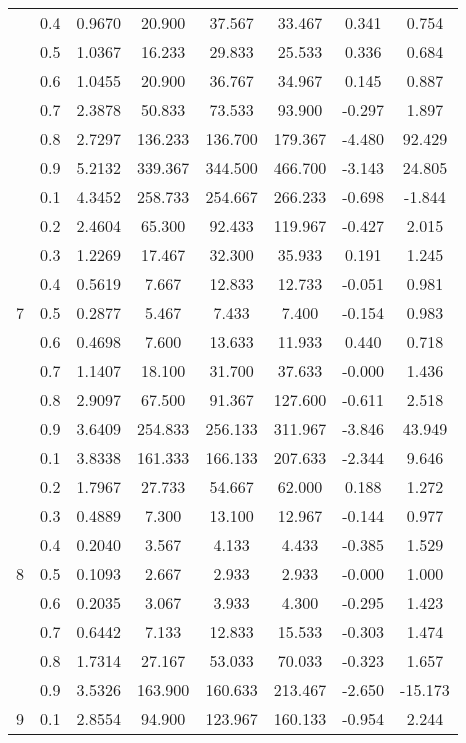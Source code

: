 \documentclass[11pt,a4paper]{report}
\begin{document}
\begin{longtable}{ | c | c || c | c | c | c | c | c | }
 & 0.4 & 0.9670 & 20.900 & 37.567 & 33.467 & 0.341 & 0.754 \\
 & 0.5 & 1.0367 & 16.233 & 29.833 & 25.533 & 0.336 & 0.684 \\
 & 0.6 & 1.0455 & 20.900 & 36.767 & 34.967 & 0.145 & 0.887 \\
 & 0.7 & 2.3878 & 50.833 & 73.533 & 93.900 & -0.297 & 1.897 \\
 & 0.8 & 2.7297 & 136.233 & 136.700 & 179.367 & -4.480 & 92.429 \\
 & 0.9 & 5.2132 & 339.367 & 344.500 & 466.700 & -3.143 & 24.805 \\
 \hline
\multirow{9}{*}{7} & 0.1 & 4.3452 & 258.733 & 254.667 & 266.233 & -0.698 & -1.844 \\
 & 0.2 & 2.4604 & 65.300 & 92.433 & 119.967 & -0.427 & 2.015 \\
 & 0.3 & 1.2269 & 17.467 & 32.300 & 35.933 & 0.191 & 1.245 \\
 & 0.4 & 0.5619 & 7.667 & 12.833 & 12.733 & -0.051 & 0.981 \\
 & 0.5 & 0.2877 & 5.467 & 7.433 & 7.400 & -0.154 & 0.983 \\
 & 0.6 & 0.4698 & 7.600 & 13.633 & 11.933 & 0.440 & 0.718 \\
 & 0.7 & 1.1407 & 18.100 & 31.700 & 37.633 & -0.000 & 1.436 \\
 & 0.8 & 2.9097 & 67.500 & 91.367 & 127.600 & -0.611 & 2.518 \\
 & 0.9 & 3.6409 & 254.833 & 256.133 & 311.967 & -3.846 & 43.949 \\
 \hline
\multirow{9}{*}{8} & 0.1 & 3.8338 & 161.333 & 166.133 & 207.633 & -2.344 & 9.646 \\
 & 0.2 & 1.7967 & 27.733 & 54.667 & 62.000 & 0.188 & 1.272 \\
 & 0.3 & 0.4889 & 7.300 & 13.100 & 12.967 & -0.144 & 0.977 \\
 & 0.4 & 0.2040 & 3.567 & 4.133 & 4.433 & -0.385 & 1.529 \\
 & 0.5 & 0.1093 & 2.667 & 2.933 & 2.933 & -0.000 & 1.000 \\
 & 0.6 & 0.2035 & 3.067 & 3.933 & 4.300 & -0.295 & 1.423 \\
 & 0.7 & 0.6442 & 7.133 & 12.833 & 15.533 & -0.303 & 1.474 \\
 & 0.8 & 1.7314 & 27.167 & 53.033 & 70.033 & -0.323 & 1.657 \\
 & 0.9 & 3.5326 & 163.900 & 160.633 & 213.467 & -2.650 & -15.173 \\
 \hline
\multirow{9}{*}{9} & 0.1 & 2.8554 & 94.900 & 123.967 & 160.133 & -0.954 & 2.244 \\

\end{longtable}
\end{document}
